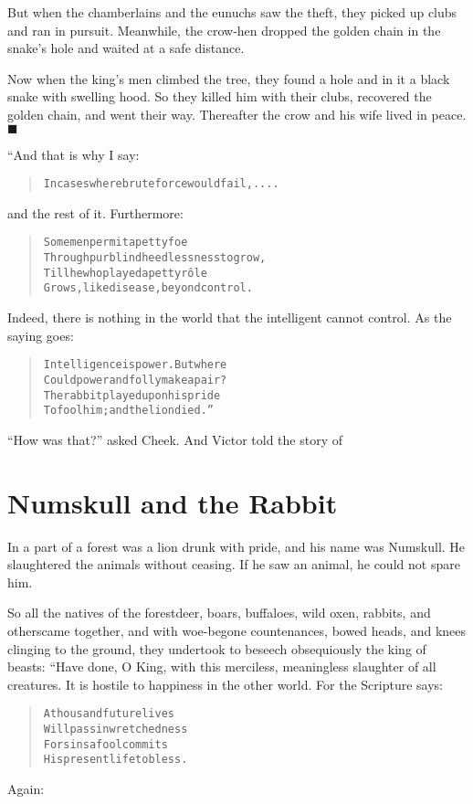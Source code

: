 \documentclass[article, twoside, 14pt]{memoir}
\newcommand{\qed}{\hfill \ensuremath{\blacksquare}}
\renewenvironment{verbatim}{%
\begin{quote}%
\vskip -10pt%
\begin{alltt}\normalfont\large}{\end{alltt}%
\end{quote}%
\vskip -10pt
} %
\begin{document}
But when the chamberlains and the eunuchs saw the theft, they
picked up clubs and ran in pursuit. Meanwhile, the crow-hen dropped
the golden chain in the snake's hole and waited at a safe
distance.

Now when the king's men climbed the tree, they found a hole and in
it a black snake with swelling hood. So they killed him with their
clubs, recovered the golden chain, and went their way. Thereafter
the crow and his wife lived in peace.\hyperref[s8]{\qed}

“And that is why I say:

\begin{verbatim}
In cases where brute force would fail, ....
\end{verbatim}
and the rest of it. Furthermore:

\begin{verbatim}
Some men permit a petty foe
Through purblind heedlessness to grow,
Till he who played a petty rôle
Grows, like disease, beyond control.
\end{verbatim}
Indeed, there is nothing in the world that the intelligent cannot
control. As the saying goes:

\begin{verbatim}
Intelligence is power. But where
Could power and folly make a pair?
The rabbit played upon his pride
To fool him; and the lion died.”
\end{verbatim}
``How was that?'' asked Cheek. And Victor told the story of

\chapter{Numskull and the Rabbit}

\label{s10}

In a part of a forest was a lion drunk with pride, and his name was
Numskull. He slaughtered the animals without ceasing. If he saw an
animal, he could not spare him.

So all the natives of the forest{\textemdash}deer, boars, buffaloes, wild
oxen, rabbits, and others{\textemdash}came together, and with woe-begone
countenances, bowed heads, and knees clinging to the ground, they
undertook to beseech obsequiously the king of beasts: “Have done, O
King, with this merciless, meaningless slaughter of all creatures.
It is hostile to happiness in the other world. For the Scripture
says:

\begin{verbatim}
A thousand future lives
    Will pass in wretchedness
For sins a fool commits
    His present life to bless.
\end{verbatim}
Again:
\end{document}
